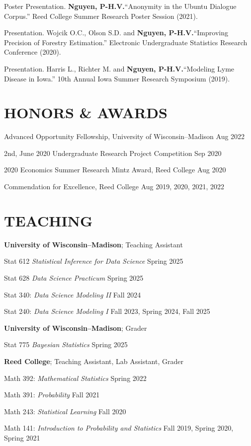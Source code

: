 \documentclass[margin]{res}
\def\pvn{\textbf{Nguyen, P-H.V.}}
\begin{document}
\begin{resume}
Poster Presentation. \pvn ``Anonymity in the Ubuntu Dialogue Corpus.” Reed College Summer Research Poster Session (2021).

Presentation. Wojcik O.C., Olson S.D. and \pvn ``Improving Precision of Forestry Estimation.” Electronic Undergraduate Statistics Research Conference (2020).

Presentation. Harris L., Richter M. and \pvn ``Modeling Lyme Disease in Iowa.” 10th Annual Iowa Summer Research Symposium (2019).


\section{HONORS \& AWARDS} 

Advanced Opportunity Fellowship, University of Wisconsin--Madison \hfill Aug 2022

2nd, June 2020 Undergraduate Research Project Competition \hfill Sep 2020

2020 Economics Summer Research Mintz Award, Reed College \hfill Aug 2020

Commendation for Excellence, Reed College \hfill Aug 2019, 2020, 2021, 2022

\section{TEACHING}

\textbf{University of Wisconsin--Madison}; Teaching Assistant

Stat 612 {\it Statistical Inference for Data Science}  \hfill Spring 2025

Stat 628 {\it Data Science Practicum} \hfill Spring 2025

Stat 340: {\it Data Science Modeling II} \hfill Fall 2024

Stat 240: {\it Data Science Modeling I} \hfill Fall 2023, Spring 2024, Fall 2025

\textbf{University of Wisconsin--Madison}; Grader

Stat 775 {\it Bayesian Statistics} \hfill Spring 2025

\textbf{Reed College}; Teaching Assistant, Lab Assistant, Grader 

Math 392: {\it Mathematical Statistics} \hfill Spring 2022

Math 391: {\it Probability} \hfill Fall 2021

Math 243: {\it Statistical Learning} \hfill Fall 2020

Math 141: {\it Introduction to Probability and Statistics} \hfill Fall 2019, Spring 2020, Spring 2021


\end{resume}
\end{document}
